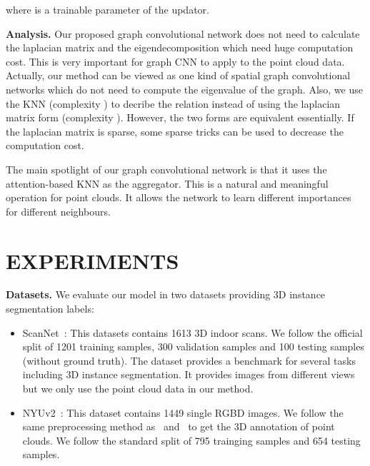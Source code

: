 \documentclass{article}
\begin{document}
where  is a trainable parameter of the updator.

\textbf{Analysis. }Our proposed graph convolutional network does not need to calculate the laplacian matrix and the eigendecomposition which need huge computation cost. This is very important for graph CNN to apply to the point cloud data. 
Actually, our method can be viewed as one kind of spatial graph convolutional networks which do not need to compute the eigenvalue of the graph. Also, we use the KNN (complexity ) to decribe the relation instead of using the laplacian matrix form (complexity ). However, the two forms are equivalent essentially. If the laplacian matrix is sparse, some sparse tricks can be used to decrease the computation cost.

The main spotlight of our graph convolutional network is that it uses the attention-based KNN as the aggregator. This is a natural and meaningful operation for point clouds. It allows the network to learn different importances for different neighbours.


\section{EXPERIMENTS}
\textbf{Datasets. }
We evaluate our model in two datasets providing 3D instance segmentation labels:
\begin{itemize}
	\item ScanNet~\cite{dai2017scannet}: This datasets contains 1613 3D indoor scans. We follow the official split of 1201 training samples, 300 validation samples and 100 testing samples (without ground truth). The dataset provides a benchmark for several tasks including 3D instance segmentation. It provides images from different views but we only use the point cloud data in our method.
	
	\item NYUv2~\cite{silberman2012indoor}: This dataset contains 1449 single RGBD images. We follow the same preprocessing method as~\cite{wang2018sgpn} and~\cite{yi2018gspn} to get the 3D annotation of point clouds. We follow the standard split of 795 trainging samples and 654 testing samples. 
\end{itemize}
\end{document}
